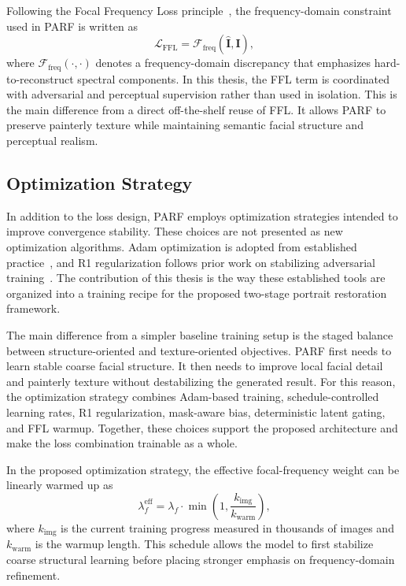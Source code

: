 \documentclass[12pt, twoside]{report}
\begin{document}
Following the Focal Frequency Loss principle~\cite{jiang2021ffl}, the frequency-domain constraint used in PARF is written as
\begin{equation}
\mathcal{L}_{\mathrm{FFL}} = \mathcal{F}_{\mathrm{freq}}(\hat{\mathbf{I}}, \mathbf{I}),
\end{equation}
where $\mathcal{F}_{\mathrm{freq}}(\cdot,\cdot)$ denotes a frequency-domain discrepancy that emphasizes hard-to-reconstruct spectral components. In this thesis, the FFL term is coordinated with adversarial and perceptual supervision rather than used in isolation. This is the main difference from a direct off-the-shelf reuse of FFL. It allows PARF to preserve painterly texture while maintaining semantic facial structure and perceptual realism.

\subsection{Optimization Strategy}

In addition to the loss design, PARF employs optimization strategies intended to improve convergence stability. These choices are not presented as new optimization algorithms. Adam optimization is adopted from established practice~\cite{kingma2015adam}, and R1 regularization follows prior work on stabilizing adversarial training~\cite{mescheder2018training}. The contribution of this thesis is the way these established tools are organized into a training recipe for the proposed two-stage portrait restoration framework.

The main difference from a simpler baseline training setup is the staged balance between structure-oriented and texture-oriented objectives. PARF first needs to learn stable coarse facial structure. It then needs to improve local facial detail and painterly texture without destabilizing the generated result. For this reason, the optimization strategy combines Adam-based training, schedule-controlled learning rates, R1 regularization, mask-aware bias, deterministic latent gating, and FFL warmup. Together, these choices support the proposed architecture and make the loss combination trainable as a whole.

In the proposed optimization strategy, the effective focal-frequency weight can be linearly warmed up as
\begin{equation}
\lambda_f^{\mathrm{eff}} =
\lambda_f \cdot \min\left(1,\frac{k_{\mathrm{img}}}{k_{\mathrm{warm}}}\right),
\end{equation}
where $k_{\mathrm{img}}$ is the current training progress measured in thousands of images and $k_{\mathrm{warm}}$ is the warmup length. This schedule allows the model to first stabilize coarse structural learning before placing stronger emphasis on frequency-domain refinement.
\end{document}
